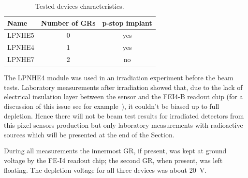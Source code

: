 \begin{table}[!htbp]
\centering
\caption{\label{tab:device_charact}Tested devices characteristics.}
\smallskip
\begin{tabular}{lcc}
\hline
\hline
Name&Number of GRs& p-stop implant\\
\hline
LPNHE5 & 0 & yes\\
LPNHE4 & 1 & yes\\
LPNHE7 & 2 & no\\
\hline
\end{tabular}
\end{table}


The LPNHE4 module was used in an irradiation experiment before the beam tests. Laboratory measurements after irradiation showed that, due to the lack of  electrical insulation layer
between the sensor and the FEI4-B readout chip (for a discussion of this issue see for example~\cite{rossi2006pixel}), it couldn't be biased up to full depletion. Hence there will not be
beam test results for irradiated detectors from this pixel sensors production but only laboratory 
measurements with radioactive sources which will be presented at the end of the Section.


During all measurements the innermost GR, if present, was kept at
 ground voltage by the FE-I4 readout chip; the second GR, when present, was left floating. The depletion voltage for all three devices was about 20~V.

